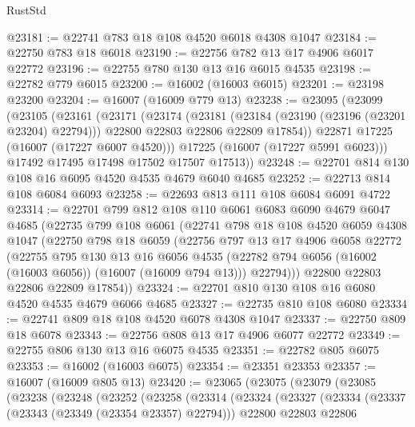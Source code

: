 \begin{lexlean}{RustStd}
\begin{coremodule}
@23181 := @22741 @783 @18 @108 @4520 @6018 @4308 @1047
@23184 := @22750 @783 @18 @6018
@23190 := @22756 @782 @13 @17 @4906 @6017 @22772
@23196 := @22755 @780 @130 @13 @16 @6015 @4535
@23198 := @22782 @779 @6015
@23200 := @16002 (@16003 @6015)
@23201 := @23198 @23200
@23204 := @16007 (@16009 @779 @13)
@23238 := @23095
    (@23099
      (@23105
        (@23161
          (@23171
            (@23174
              (@23181
                (@23184 (@23190 (@23196 (@23201 @23204) @22794)))
                @22800
                @22803
                @22806
                @22809
                @17854))
            @22871
            @17225
            (@16007 (@17227 @6007 @4520)))
          @17225
          (@16007 (@17227 @5991 @6023)))
        @17492
        @17495
        @17498
        @17502
        @17507
        @17513))
@23248 := @22701 @814 @130 @108 @16 @6095 @4520 @4535 @4679 @6040 @4685
@23252 := @22713 @814 @108 @6084 @6093
@23258 := @22693 @813 @111 @108 @6084 @6091 @4722
@23314 := @22701
    @799
    @812
    @108
    @110
    @6061
    @6083
    @6090
    @4679
    @6047
    @4685
    (@22735
      @799
      @108
      @6061
      (@22741
        @798
        @18
        @108
        @4520
        @6059
        @4308
        @1047
        (@22750
          @798
          @18
          @6059
          (@22756
            @797
            @13
            @17
            @4906
            @6058
            @22772
            (@22755
              @795
              @130
              @13
              @16
              @6056
              @4535
              (@22782 @794 @6056 (@16002 (@16003 @6056)) (@16007 (@16009 @794 @13)))
              @22794)))
        @22800
        @22803
        @22806
        @22809
        @17854))
@23324 := @22701 @810 @130 @108 @16 @6080 @4520 @4535 @4679 @6066 @4685
@23327 := @22735 @810 @108 @6080
@23334 := @22741 @809 @18 @108 @4520 @6078 @4308 @1047
@23337 := @22750 @809 @18 @6078
@23343 := @22756 @808 @13 @17 @4906 @6077 @22772
@23349 := @22755 @806 @130 @13 @16 @6075 @4535
@23351 := @22782 @805 @6075
@23353 := @16002 (@16003 @6075)
@23354 := @23351 @23353
@23357 := @16007 (@16009 @805 @13)
@23420 := @23065
    (@23075
      (@23079
        (@23085
          (@23238
            (@23248
              (@23252
                (@23258
                  (@23314
                    (@23324
                      (@23327
                        (@23334
                          (@23337 (@23343 (@23349 (@23354 @23357) @22794)))
                          @22800
                          @22803
                          @22806

\end{coremodule}
\end{lexlean}
